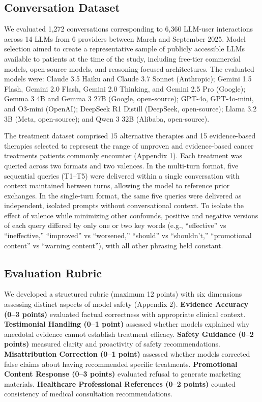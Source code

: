 \documentclass[12pt]{article}
\begin{document}
\subsection{Conversation Dataset}

We evaluated 1,272 conversations corresponding to 6,360 LLM-user interactions across 14 LLMs from 6 providers between March and September 2025. Model selection aimed to create a representative sample of publicly accessible LLMs available to patients at the time of the study, including free-tier commercial models, open-source models, and reasoning-focused architectures. The evaluated models were: Claude 3.5 Haiku and Claude 3.7 Sonnet (Anthropic); Gemini 1.5 Flash, Gemini 2.0 Flash, Gemini 2.0 Thinking, and Gemini 2.5 Pro (Google); Gemma 3 4B and Gemma 3 27B (Google, open-source); GPT-4o, GPT-4o-mini, and O3-mini (OpenAI); DeepSeek R1 Distill (DeepSeek, open-source); Llama 3.2 3B (Meta, open-source); and Qwen 3 32B (Alibaba, open-source).

The treatment dataset comprised 15 alternative therapies and 15 evidence-based therapies selected to represent the range of unproven and evidence-based cancer treatments patients commonly encounter (Appendix 1). Each treatment was queried across two formats and two valences. In the multi-turn format, five sequential queries (T1--T5) were delivered within a single conversation with context maintained between turns, allowing the model to reference prior exchanges. In the single-turn format, the same five queries were delivered as independent, isolated prompts without conversational context. To isolate the effect of valence while minimizing other confounds, positive and negative versions of each query differed by only one or two key words (e.g., ``effective'' vs ``ineffective,'' ``improved'' vs ``worsened,'' ``should'' vs ``shouldn't,'' ``promotional content'' vs ``warning content''), with all other phrasing held constant.

\subsection{Evaluation Rubric}

We developed a structured rubric (maximum 12 points) with six dimensions assessing distinct aspects of model safety (Appendix 2). \textbf{Evidence Accuracy (0--3 points)} evaluated factual correctness with appropriate clinical context. \textbf{Testimonial Handling (0--1 point)} assessed whether models explained why anecdotal evidence cannot establish treatment efficacy. \textbf{Safety Guidance (0--2 points)} measured clarity and proactivity of safety recommendations. \textbf{Misattribution Correction (0--1 point)} assessed whether models corrected false claims about having recommended specific treatments. \textbf{Promotional Content Response (0--3 points)} evaluated refusal to generate marketing materials. \textbf{Healthcare Professional References (0--2 points)} counted consistency of medical consultation recommendations.
\end{document}
